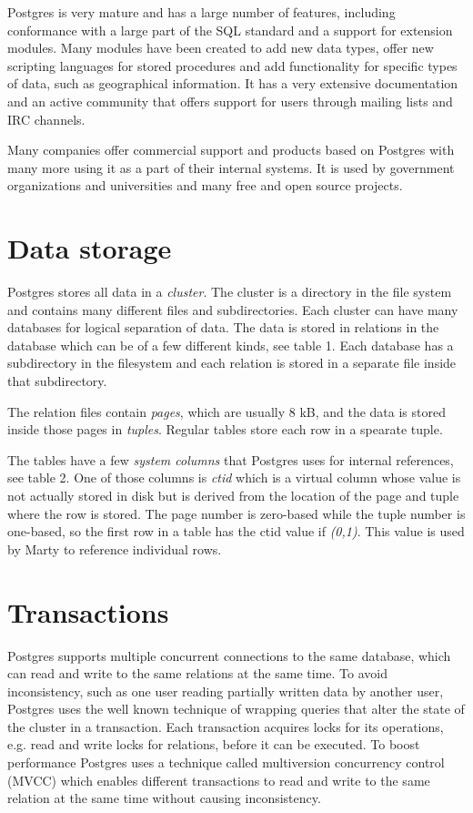 \documentclass[a4paper,12pt,twoside,BCOR=10mm]{scrbook}
\begin{document}
Postgres is very mature and has a large number of features, including conformance with a large part of the SQL standard and a support for extension modules. Many modules have been created to add new data types, offer new scripting languages for stored procedures and add functionality for specific types of data, such as geographical information. It has a very extensive documentation and an active community that offers support for users through mailing lists and IRC channels.

Many companies offer commercial support and products based on Postgres with many more using it as a part of their internal systems. It is used by government organizations and universities and many free and open source projects.

\section{Data storage}
Postgres stores all data in a \textit{cluster}. The cluster is a directory in the file system and contains many different files and subdirectories. Each cluster can have many databases for logical separation of data. The data is stored in relations in the database which can be of a few different kinds, see table 1. Each database has a subdirectory in the filesystem and each relation is stored in a separate file inside that subdirectory.


The relation files contain \textit{pages}, which are usually 8 kB, and the data is stored inside those pages in \textit{tuples}. Regular tables store each row in a spearate tuple.


The tables have a few \textit{system columns} that Postgres uses for internal references, see table 2. One of those columns is \textit{ctid} which is a virtual column whose value is not actually stored in disk but is derived from the location of the page and tuple where the row is stored. The page number is zero-based while the tuple number is one-based, so the first row in a table has the ctid value if \textit{(0,1)}. This value is used by Marty to reference individual rows.


\section{Transactions}
Postgres supports multiple concurrent connections to the same database, which can read and write to the same relations at the same time. To avoid inconsistency, such as one user reading partially written data by another user, Postgres uses the well known technique of wrapping queries that alter the state of the cluster in a transaction. Each transaction acquires locks for its operations, e.g. read and write locks for relations, before it can be executed. To boost performance Postgres uses a technique called multiversion concurrency control (MVCC) which enables different transactions to read and write to the same relation at the same time without causing inconsistency.
\end{document}
